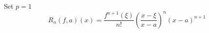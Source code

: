 \begin{theorem}
    Set $p=1$
    \begin{equation}
        R_n (f,a)(x) = \frac{f^{n+1}(\xi)}{n!}\left( \frac{x-\xi}{x-a} \right)^n (x-a)^{n+1}
    \end{equation}
\end{theorem}










































































































